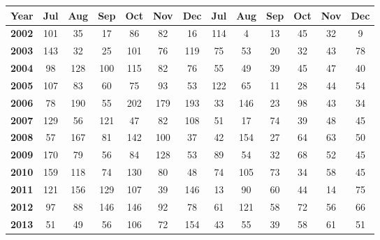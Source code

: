 \documentclass[a4paper,9pt,fleqn]{article}
\begin{document}
\begin{table}
\begin{tabularx}{14cm}{X|cccccc|cccccc}
{\bf Year}    & {\bf Jul} & {\bf Aug} & {\bf Sep} & {\bf Oct} & {\bf Nov} & {\bf Dec} & {\bf Jul} & {\bf Aug} & {\bf Sep} & {\bf Oct} & {\bf Nov} & {\bf Dec} \\ \hline
{\bf 2002}    & 101       & 35        & 17        & 86        & 82        & 16        & 114       & 4         & 13        & 45        & 32        & 9         \\
{\bf 2003}    & 143       & 32        & 25        & 101       & 76        & 119       & 75        & 53        & 20        & 32        & 43        & 78        \\
{\bf 2004}    & 98        & 128       & 100       & 115       & 82        & 76        & 55        & 49        & 39        & 45        & 47        & 40        \\
{\bf 2005}    & 107       & 83        & 60        & 75        & 93        & 53        & 122       & 65        & 11        & 28        & 44        & 54        \\
{\bf 2006}    & 78        & 190       & 55        & 202       & 179       & 193       & 33        & 146       & 23        & 98        & 43        & 34        \\
{\bf 2007}    & 129       & 56        & 121       & 47        & 82        & 108       & 51        & 17        & 74        & 39        & 48        & 45        \\
{\bf 2008}    & 57        & 167       & 81        & 142       & 100       & 37        & 42        & 154       & 27        & 64        & 63        & 50        \\
{\bf 2009}    & 170       & 79        & 56        & 84        & 128       & 53        & 89        & 54        & 32        & 68        & 52        & 45        \\ 
{\bf 2010}    & 159       & 118       & 74        & 130       & 80        & 48        & 74        & 105       & 73        & 34        & 58        & 45        \\
{\bf 2011}    & 121       & 156       & 129       & 107       & 39        & 146       & 13        & 90        & 60        & 44        & 14        & 75        \\
{\bf 2012}    & 97        & 88        & 146       & 146       & 92        & 78        & 61        & 121       & 58        & 72        & 56        & 66        \\
{\bf 2013}    & 51        & 49        & 56        & 106       & 72        & 154       & 43        & 55        & 39        & 58        & 61        & 51        \\

\end{tabularx}
\end{table}
\end{document}
